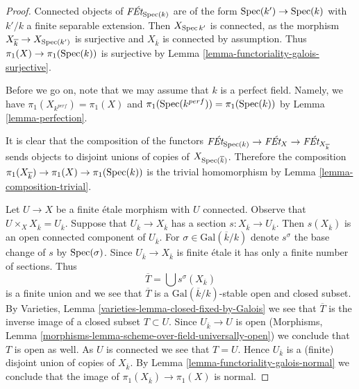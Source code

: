 \begin{proof}
Connected objects of $\textit{F\'Et}_{\mathop{\mathrm{Spec}}(k)}$ are of the form
$\mathop{\mathrm{Spec}}(k') \to \mathop{\mathrm{Spec}}(k)$ with $k'/k$ a finite separable extension.
Then $X_{\mathop{\mathrm{Spec}}{k'}}$ is connected, as the morphism
$X_{\overline{k}} \to X_{\mathop{\mathrm{Spec}}(k')}$ is surjective and
$X_{\overline{k}}$ is connected by assumption. Thus
$\pi_1(X) \to \pi_1(\mathop{\mathrm{Spec}}(k))$ is surjective by
Lemma \ref{lemma-functoriality-galois-surjective}.

\medskip\noindent
Before we go on, note that we may assume that $k$ is a perfect field.
Namely, we have $\pi_1(X_{k^{perf}}) = \pi_1(X)$ and
$\pi_1(\mathop{\mathrm{Spec}}(k^{perf})) = \pi_1(\mathop{\mathrm{Spec}}(k))$ by Lemma \ref{lemma-perfection}.

\medskip\noindent
It is clear that the composition of the functors
$\textit{F\'Et}_{\mathop{\mathrm{Spec}}(k)} \to \textit{F\'Et}_X \to
\textit{F\'Et}_{X_{\overline{k}}}$ sends objects to disjoint unions
of copies of $X_{\mathop{\mathrm{Spec}}(\overline{k})}$. Therefore the composition
$\pi_1(X_{\overline{k}}) \to \pi_1(X) \to \pi_1(\mathop{\mathrm{Spec}}(k))$
is the trivial homomorphism by Lemma \ref{lemma-composition-trivial}.

\medskip\noindent
Let $U \to X$ be a finite \'etale morphism with $U$ connected.
Observe that $U \times_X X_{\overline{k}} = U_{\overline{k}}$.
Suppose that $U_{\overline{k}} \to X_{\overline{k}}$
has a section $s : X_{\overline{k}} \to U_{\overline{k}}$.
Then $s(X_{\overline{k}})$ is an open connected component of
$U_{\overline{k}}$. For $\sigma \in \text{Gal}(\overline{k}/k)$
denote $s^\sigma$ the base change of $s$ by $\mathop{\mathrm{Spec}}(\sigma)$.
Since $U_{\overline{k}} \to X_{\overline{k}}$ is finite \'etale
it has only a finite number of sections. Thus
$$
\overline{T} = \bigcup s^\sigma(X_{\overline{k}})
$$
is a finite union and we see that $\overline{T}$ is a
$\text{Gal}(\overline{k}/k)$-stable open and closed subset.
By Varieties, Lemma \ref{varieties-lemma-closed-fixed-by-Galois}
we see that $\overline{T}$ is the inverse image of a closed
subset $T \subset U$. Since $U_{\overline{k}} \to U$ is open
(Morphisms, Lemma \ref{morphisms-lemma-scheme-over-field-universally-open})
we conclude that $T$ is open as well. As $U$ is connected we
see that $T = U$. Hence $U_{\overline{k}}$ is a (finite) disjoint
union of copies of $X_{\overline{k}}$. By
Lemma \ref{lemma-functoriality-galois-normal} we conclude that the image of
$\pi_1(X_{\overline{k}}) \to \pi_1(X)$ is normal.


\end{proof}
